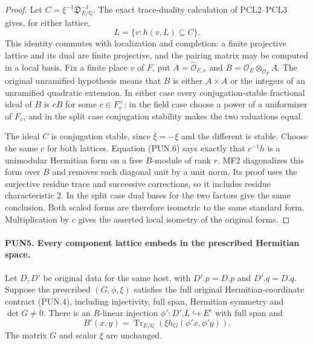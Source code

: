 \documentclass[11pt,a4paper]{article}
\numberwithin{equation}{section}
\theoremstyle{remark}\newtheorem{remark}[theorem]{Remark}
\begin{document}
\begin{proof}
Let \(C=\xi^{-1}\mathfrak D_{E/\mathbb Q}^{-1}\).  The exact
trace-duality calculation of PCL2--PCL3 gives, for either lattice,
\[
          L=\{v:h(v,L)\subseteq C\}.
 \tag{PUN.6}
\]
This identity commutes with localization and completion: a finite
projective lattice and its dual are finite projective, and the
pairing matrix may be computed in a local basis.  Fix a finite
place \(v\) of \(F\), put \(A=\widehat{\mathcal O}_{F,v}\)
and \(B=\mathcal O_E\otimes_{\mathcal O_F}A\).  The original
unramified hypothesis means that \(B\) is either \(A\times A\)
or the integers of an unramified quadratic extension.  In either
case every conjugation-stable fractional ideal of \(B\) is
\(cB\) for some \(c\in F_v^\times\): in the field case choose
a power of a uniformizer of \(F_v\), and in the split case
conjugation stability makes the two valuations equal.

The ideal \(C\) is conjugation stable, since
\(\bar\xi=-\xi\) and the different is stable.  Choose the same
\(c\) for both lattices.  Equation (PUN.6) says exactly that
\(c^{-1}h\) is a unimodular Hermitian form on a free \(B\)-module
of rank \(r\).  MF2 diagonalizes this form over \(B\) and removes
each diagonal unit by a unit norm.  Its proof uses the surjective
residue trace and successive corrections, so it includes residue
characteristic \(2\).  In the split case dual bases for the two
factors give the same conclusion.  Both scaled forms are therefore
isometric to the same standard form.  Multiplication by \(c\)
gives the asserted local isometry of the original forms.
\end{proof}

\paragraph{PUN5. Every component lattice embeds in the prescribed Hermitian space.}
\label{claim:PUN5}
Let \(D,D'\) be original data for the same host, with
\(D'.p=D.p\) and \(D'.q=D.q\).  Suppose the prescribed
\((G,\phi,\xi)\) satisfies the full original Hermitian-coordinate
contract (PUN.4), including injectivity, full span, Hermitian
symmetry and \(\det G\ne0\).  There is an \(R\)-linear
injection \(\phi':D'.L\hookrightarrow E^r\) with full span and
\[
        B'(x,y)=\operatorname{Tr}_{E/\mathbb Q}
                      (\xi h_G(\phi'x,\phi'y)).
 \tag{PUN.7}
\]
The matrix \(G\) and scalar \(\xi\) are unchanged.
\end{document}
